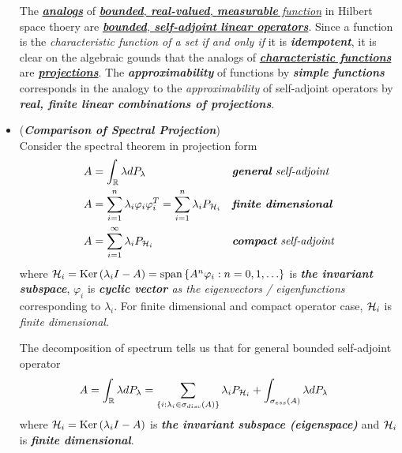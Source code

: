 \documentclass[11pt]{article}
\begin{document}
\begin{itemize}
\begin{remark}
The \underline{\emph{\textbf{analogs}}} of \underline{\emph{\textbf{bounded}, \textbf{real-valued}, \textbf{measurable} function}} in Hilbert space thoery are \underline{\emph{\textbf{bounded}, \textbf{self-adjoint} \textbf{linear operators}}}. Since a function is the \emph{characteristic function of a set} \emph{if and only if} it is \emph{\textbf{idempotent}}, it is clear on the algebraic gounds that the analogs of \underline{\emph{\textbf{characteristic functions}}} are \underline{\emph{\textbf{projections}}}. The \emph{\textbf{approximability}} of functions by \emph{\textbf{simple functions}} corresponds in the analogy to the \emph{approximability} of self-adjoint operators by \emph{\textbf{real, finite linear combinations of projections}}. 
\end{remark}

\item \begin{remark}(\emph{\textbf{Comparison of Spectral Projection}})\\
Consider the spectral theorem in projection form
\begin{align*}
A &= \int_{{\mathbb R}} \lambda dP_{\lambda}  &&\text{\emph{\textbf{general} self-adjoint }}\\
A &= \sum_{i=1}^{n}\lambda_i \varphi_i \varphi_i^{T} =  \sum_{i=1}^{n}\lambda_i P_{{\mathcal H}_i} &&\text{\emph{\textbf{finite dimensional}}} \\
A &=  \sum_{i=1}^{\infty}\lambda_i P_{{\mathcal H}_i} &&\text{\emph{\textbf{compact} self-adjoint}} 
\end{align*} where ${\mathcal H}_i = \text{Ker}\left(\lambda_i I - A\right) = \text{span}\left\{A^n \varphi_i: n=0,1,\ldots\right\}$ is \emph{\textbf{the invariant subspace}}, $\varphi_i$ is \emph{\textbf{cyclic vector} as the eigenvectors / eigenfunctions} corresponding to $\lambda_i$. For finite dimensional and compact operator case, ${\mathcal H}_i$ is \emph{finite dimensional}.

The decomposition of spectrum tells us that for general bounded self-adjoint operator
\begin{align}
A &= \int_{{\mathbb R}} \lambda dP_{\lambda} = \sum_{\left\{i: \lambda_i \in \sigma_{disc}(A)\right\}}\lambda_i P_{{\mathcal H}_i} + \int_{\sigma_{ess}(A)}\lambda dP_{\lambda} \label{eqn: spectral_theorem_decomposition}
\end{align} where ${\mathcal H}_i=\text{Ker}\left(\lambda_i I - A\right)$ is \emph{\textbf{the invariant subspace (eigenspace)}} and ${\mathcal H}_i$ is \emph{\textbf{finite dimensional}}.
\end{remark}

\end{itemize}
\end{document}

